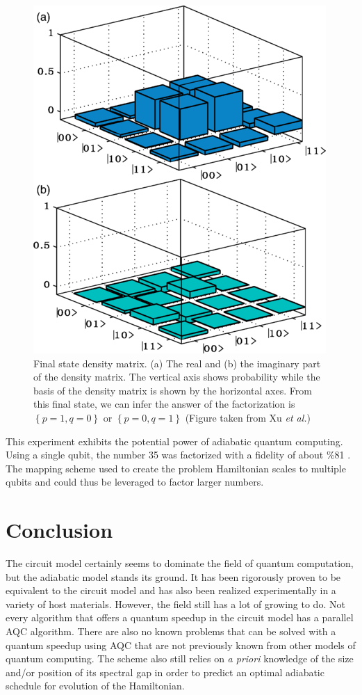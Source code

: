 \documentclass[%
 reprint,
 amsmath,amssymb,
 aps,
]{revtex4-1}
\begin{document}
	\begin{figure}
	\includegraphics[scale=0.49]{Fig3XuEtAl}
	\caption{	
		Final state density matrix. (a) The real and (b) the imaginary part of the density matrix. The vertical axis shows probability while the basis of the density matrix is shown by the horizontal axes. From this final state, we can infer the answer of the factorization is $\left\lbrace p=1, q=0 \right\rbrace$ or $\left\lbrace p=0, q=1 \right\rbrace$ (Figure taken from Xu \textit{et al.}\cite{Xu2017})
	}
	\label{fig:densitymatrix}	
	\end{figure}
	
	
	This experiment exhibits the potential power of adiabatic quantum computing. Using a single qubit, the number 35 was factorized with a fidelity of about \%81 \cite{Xu2017}. The mapping scheme used to create the problem Hamiltonian scales to multiple qubits and could thus be leveraged to factor larger numbers.
	
	\section{Conclusion}
		
	The circuit model certainly seems to dominate the field of quantum computation, but the adiabatic model stands its ground. It has been rigorously proven to be equivalent to the circuit model and has also been realized experimentally in a variety of host materials. However, the field still has a lot of growing to do. Not every algorithm that offers a quantum speedup in the circuit model has a parallel AQC algorithm. There are also no known problems that can be solved with a quantum speedup using AQC that are not previously known from other models of quantum computing. The scheme also still relies on \textit{a priori} knowledge of the size and/or position of its spectral gap in order to predict an optimal adiabatic schedule for evolution of the Hamiltonian.	
\end{document}
